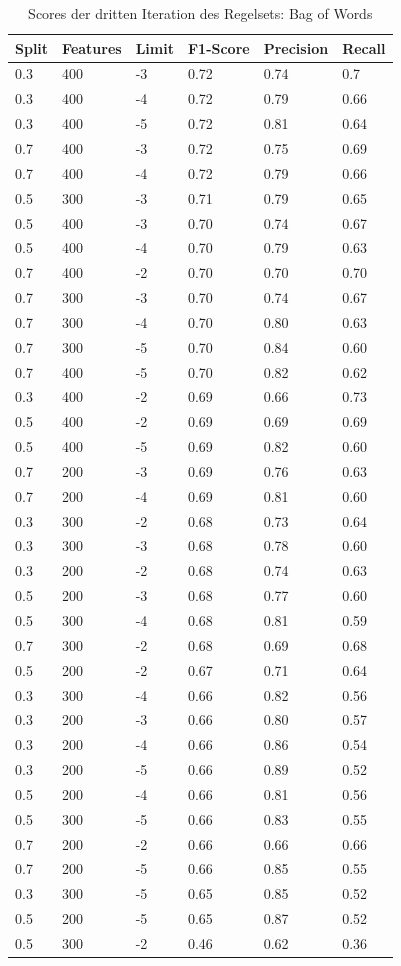 \begin{table}
	\caption{Scores der dritten Iteration des Regelsets: Bag of Words}
	\centering
	\label{tab:bow3}
\begin{tabular}{ | l | l | l | l | l | l | }
	\hline
	Split & Features & Limit & F1-Score & Precision & Recall \\ \hline
	0.3 & 400 & -3 & 0.72 & 0.74 & 0.7 \\ 
	0.3 & 400 & -4 & 0.72 & 0.79 & 0.66 \\
	0.3 & 400 & -5 & 0.72 & 0.81 & 0.64 \\
	0.7 & 400 & -3 & 0.72 & 0.75 & 0.69 \\
	0.7 & 400 & -4 & 0.72 & 0.79 & 0.66 \\
	0.5 & 300 & -3 & 0.71 & 0.79 & 0.65 \\
	0.5 & 400 & -3 & 0.70 & 0.74 & 0.67 \\
	0.5 & 400 & -4 & 0.70 & 0.79 & 0.63 \\ 
	0.7 & 400 & -2 & 0.70 & 0.70 & 0.70 \\ 
	0.7 & 300 & -3 & 0.70 & 0.74 & 0.67 \\
	0.7 & 300 & -4 & 0.70 & 0.80 & 0.63 \\
	0.7 & 300 & -5 & 0.70 & 0.84 & 0.60 \\
	0.7 & 400 & -5 & 0.70 & 0.82 & 0.62 \\ 
	0.3 & 400 & -2 & 0.69 & 0.66 & 0.73 \\ 
	0.5 & 400 & -2 & 0.69 & 0.69 & 0.69 \\ 
	0.5 & 400 & -5 & 0.69 & 0.82 & 0.60 \\ 
	0.7 & 200 & -3 & 0.69 & 0.76 & 0.63 \\ 
	0.7 & 200 & -4 & 0.69 & 0.81 & 0.60 \\ 
	0.3 & 300 & -2 & 0.68 & 0.73 & 0.64 \\ 
	0.3 & 300 & -3 & 0.68 & 0.78 & 0.60 \\ 
	0.3 & 200 & -2 & 0.68 & 0.74 & 0.63 \\ 
	0.5 & 200 & -3 & 0.68 & 0.77 & 0.60 \\ 
	0.5 & 300 & -4 & 0.68 & 0.81 & 0.59 \\ 
	0.7 & 300 & -2 & 0.68 & 0.69 & 0.68 \\ 
	0.5 & 200 & -2 & 0.67 & 0.71 & 0.64 \\ 
	0.3 & 300 & -4 & 0.66 & 0.82 & 0.56 \\ 
	0.3 & 200 & -3 & 0.66 & 0.80 & 0.57 \\
	0.3 & 200 & -4 & 0.66 & 0.86 & 0.54 \\
	0.3 & 200 & -5 & 0.66 & 0.89 & 0.52 \\ 
	0.5 & 200 & -4 & 0.66 & 0.81 & 0.56 \\
	0.5 & 300 & -5 & 0.66 & 0.83 & 0.55 \\ 
	0.7 & 200 & -2 & 0.66 & 0.66 & 0.66 \\ 
	0.7 & 200 & -5 & 0.66 & 0.85 & 0.55 \\ 
	0.3 & 300 & -5 & 0.65 & 0.85 & 0.52 \\ 
	0.5 & 200 & -5 & 0.65 & 0.87 & 0.52 \\
	0.5 & 300 & -2 & 0.46 & 0.62 & 0.36 \\ \hline
\end{tabular}
\end{table}

